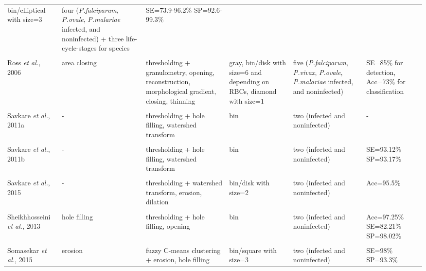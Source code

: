 \begin{longtable}{C{2.1cm} C{2.7cm} C{2.2cm} C{2.0cm} C{2.7cm} C{2.0cm} }
    	bin/elliptical with size=3 &
    	four (\emph{P.falciparum}, \emph{P.ovale}, \emph{P.malariae} infected, and noninfected) +
    three life-cycle-stages for species &
    	SE=73.9-96.2\% SP=92.6-99.3\%
    \\
&   &  &  &  & \\
    Ross \emph{et al.}, 2006  &
    	area closing &
    	thresholding + granulometry, opening, reconstruction, morphological gradient, closing, thinning  &
        gray, bin/disk with size=6 and depending on RBCs, diamond with size=1 &
    	five (\emph{P.falciparum}, \emph{P.vivax}, \emph{P.ovale}, \emph{P.malariae} infected, and noninfected) &
    	SE=85\% for detection, Acc=73\% for classification
    \\
&   &  &  &  & \\
    Savkare \emph{et al.}, 2011a  &
    	- &
    	thresholding + hole filling, watershed transform  &
    	bin &
    	two (infected and noninfected) &
    	-
    \\
&   &  &  &  & \\
    Savkare \emph{et al.}, 2011b  &
    	- &
    	thresholding + hole filling, watershed transform  &
    	bin &
    	two (infected and noninfected) &
    	SE=93.12\% SP=93.17\%
    \\
&   &  &  &  & \\
    Savkare \emph{et al.}, 2015  &
    	- &
    	thresholding + watershed transform, erosion, dilation  &
    	bin/disk with size=2 &
    	two (infected and noninfected) &
    	Acc=95.5\%
    \\
&   &  &  &  & \\
    Sheikhhosseini \emph{et al.}, 2013  &
    	hole filling &
    	thresholding + hole filling, opening  &
    	bin &
    	two (infected and noninfected) &
    	Acc=97.25\% SE=82.21\% SP=98.02\%
    \\
&   &  &  &  & \\
    Somasekar \emph{et al.}, 2015  &
    	erosion &
    	fuzzy C-means clustering + erosion, hole filling  &
    	bin/square with size=3 &
    	two (infected and noninfected) &
    	SE=98\% SP=93.3\%
    \\

\end{longtable}

